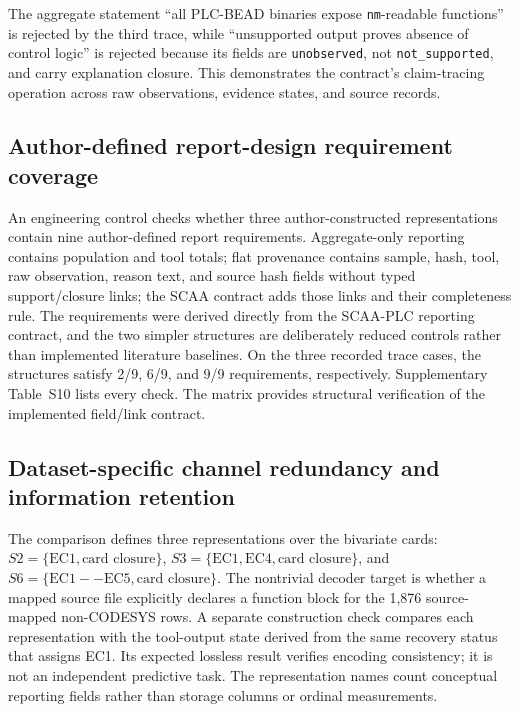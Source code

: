 \documentclass[a4paper,fleqn]{cas-dc}
\begin{document}
The aggregate statement ``all PLC-BEAD binaries expose \texttt{nm}-readable functions'' is rejected by the third trace, while ``unsupported output proves absence of control logic'' is rejected because its fields are \texttt{unobserved}, not \texttt{not\_supported}, and carry explanation closure. This demonstrates the contract's claim-tracing operation across raw observations, evidence states, and source records.

\subsection{Author-defined report-design requirement coverage}

An engineering control checks whether three author-constructed representations contain nine author-defined report requirements. Aggregate-only reporting contains population and tool totals; flat provenance contains sample, hash, tool, raw observation, reason text, and source hash fields without typed support/closure links; the SCAA contract adds those links and their completeness rule. The requirements were derived directly from the SCAA-PLC reporting contract, and the two simpler structures are deliberately reduced controls rather than implemented literature baselines. On the three recorded trace cases, the structures satisfy 2/9, 6/9, and 9/9 requirements, respectively. Supplementary Table~S10 lists every check. The matrix provides structural verification of the implemented field/link contract.

\subsection{Dataset-specific channel redundancy and information retention}

The comparison defines three representations over the bivariate cards: \(S2=\{\mathrm{EC1},\text{card closure}\}\), \(S3=\{\mathrm{EC1},\mathrm{EC4},\text{card closure}\}\), and \(S6=\{\mathrm{EC1--EC5},\text{card closure}\}\). The nontrivial decoder target is whether a mapped source file explicitly declares a function block for the 1{,}876 source-mapped non-CODESYS rows. A separate construction check compares each representation with the tool-output state derived from the same recovery status that assigns EC1. Its expected lossless result verifies encoding consistency; it is not an independent predictive task. The representation names count conceptual reporting fields rather than storage columns or ordinal measurements.
\end{document}
